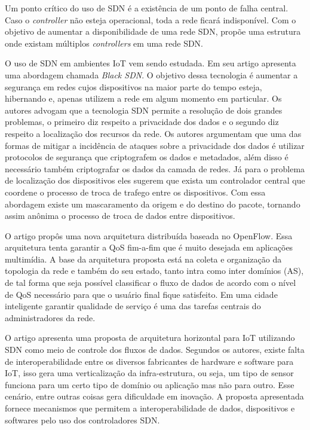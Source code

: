 \documentclass[12pt]{article}
\begin{document}
Um ponto crítico do uso de SDN é a existência de um ponto de falha central. Caso o \textit{controller} não esteja operacional, toda a rede ficará indisponível. Com o objetivo de aumentar a disponibilidade de uma rede SDN, \cite{Dixit2013} propõe uma estrutura onde existam múltiplos \textit{controllers} em uma rede SDN.

O uso de SDN em ambientes IoT vem sendo estudada. Em seu artigo \cite{7366932} apresenta uma abordagem chamada \textit{Black SDN}. O objetivo dessa tecnologia é aumentar a segurança em redes cujos dispositivos na maior parte do tempo esteja, hibernando e, apenas utilizem a rede em algum momento em particular. Os autores advogam que a tecnologia SDN permite a resolução de dois grandes problemas, o primeiro diz respeito a privacidade dos dados e o segundo diz respeito a localização dos recursos da rede. Os autores argumentam que uma das formas de mitigar a incidência de ataques sobre a privacidade dos dados é utilizar protocolos de segurança que criptografem os dados e metadados, além disso é necessário também criptografar os dados da camada de redes. Já para o problema de localização dos dispositivos eles sugerem que exista um controlador central que coordene o processo de troca de trafego entre os dispositivos. Com essa abordagem existe um mascaramento da origem e do destino do pacote, tornando assim anônima o processo de troca de dados entre dispositivos.

O artigo \cite{6819050} propôs uma nova arquitetura distribuída baseada no OpenFlow. Essa arquitetura tenta garantir a QoS fim-a-fim que é muito desejada em aplicações multimídia. A base da arquitetura proposta está na coleta e organização da topologia da rede e também do seu estado, tanto intra como inter domínios (AS), de tal forma que seja possível classificar o fluxo de dados de acordo com o nível de QoS necessário para que o usuário final fique satisfeito. Em uma cidade inteligente garantir qualidade de serviço é uma das tarefas centrais do administradores da rede.

O artigo \cite{Li2016} apresenta uma proposta de arquitetura horizontal para IoT utilizando SDN como meio de controle dos fluxos de dados. Segundos os autores, existe falta de interoperabilidade entre os diversos fabricantes de hardware e software para IoT, isso gera uma verticalização da infra-estrutura, ou seja, um tipo de sensor funciona para um certo tipo de domínio ou aplicação mas não para outro. Esse cenário, entre outras coisas gera dificuldade em inovação.  A proposta apresentada fornece mecanismos que permitem a interoperabilidade de dados, dispositivos e softwares pelo uso dos controladores SDN.
\end{document}
